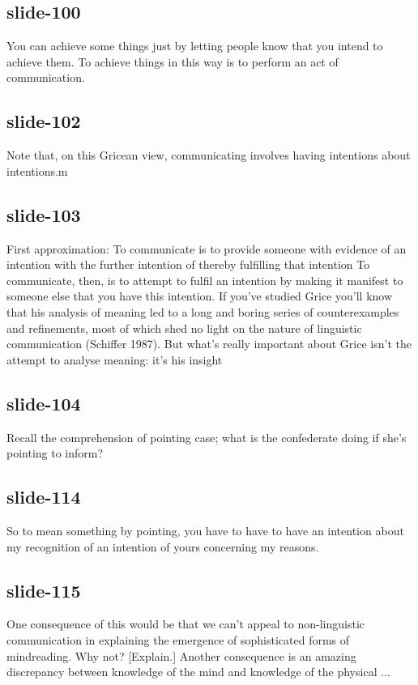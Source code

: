\documentclass[12pt,\papersize]{extarticle}
\begin{document}
 
\subsection{slide-100}
You can achieve some things just by letting people know that you intend to achieve them. To achieve things in this way is to perform an act of communication.
 
 
\subsection{slide-102}
Note that, on this Gricean view, communicating involves having intentions about intentions.m
 
 
\subsection{slide-103}
First approximation: To communicate is to provide someone with evidence of an intention with the further intention of thereby fulfilling that intention
To communicate, then, is to attempt to fulfil an intention by making it manifest to someone else that you have this intention. If you’ve studied Grice you’ll know that his analysis of meaning led to a long and boring series of counterexamples and refinements, most of which shed no light on the nature of linguistic communication (Schiffer 1987). But what’s really important about Grice isn’t the attempt to analyse meaning: it’s his insight
 
 
\subsection{slide-104}
Recall the comprehension of pointing case; what is the confederate doing if she's pointing to inform?
 
 
\subsection{slide-114}
So to mean something by pointing, you have to have to have an intention about my recognition of an intention of yours concerning my reasons.
 
 
\subsection{slide-115}
One consequence of this would be that we can't appeal to non-linguistic communication in explaining the emergence of sophisticated forms of mindreading.
Why not? [Explain.]
Another consequence is an amazing discrepancy between knowledge of the mind and knowledge of the physical ...
 
\end{document}
